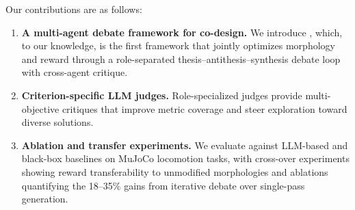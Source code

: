 Our contributions are as follows:
\begin{enumerate}[leftmargin=*,nosep]
    \item \textbf{A multi-agent debate framework for co-design.} We introduce \abbrev{}, which, to our knowledge, is the first framework that jointly optimizes morphology and reward through a role-separated thesis--antithesis--synthesis debate loop with cross-agent critique.
    \item \textbf{Criterion-specific LLM judges.} Role-specialized judges provide multi-objective critiques that improve metric coverage and steer exploration toward diverse solutions.
    \item \textbf{Ablation and transfer experiments.} We evaluate \abbrev{} against LLM-based and black-box baselines on MuJoCo locomotion tasks, with cross-over experiments showing reward transferability to unmodified morphologies and ablations quantifying the 18--35\% gains from iterative debate over single-pass generation.
\end{enumerate}
